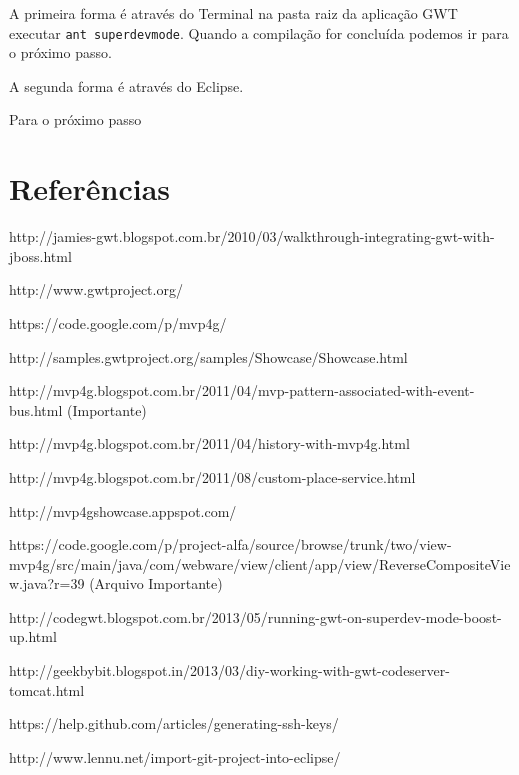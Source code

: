 A primeira forma é através do Terminal na pasta raiz da aplicação GWT executar \texttt{ant superdevmode}. Quando a compilação for
concluída podemos ir para o próximo passo.

A segunda forma é através do Eclipse.

Para o próximo passo




\section{Referências}

http://jamies-gwt.blogspot.com.br/2010/03/walkthrough-integrating-gwt-with-jboss.html

http://www.gwtproject.org/

https://code.google.com/p/mvp4g/

http://samples.gwtproject.org/samples/Showcase/Showcase.html

http://mvp4g.blogspot.com.br/2011/04/mvp-pattern-associated-with-event-bus.html (Importante)

http://mvp4g.blogspot.com.br/2011/04/history-with-mvp4g.html

http://mvp4g.blogspot.com.br/2011/08/custom-place-service.html

http://mvp4gshowcase.appspot.com/

https://code.google.com/p/project-alfa/source/browse/trunk/two/view-mvp4g/src/main/java/com/webware/view/client/app/view/ReverseCompositeView.java?r=39
(Arquivo Importante)

http://codegwt.blogspot.com.br/2013/05/running-gwt-on-superdev-mode-boost-up.html

http://geekbybit.blogspot.in/2013/03/diy-working-with-gwt-codeserver-tomcat.html

https://help.github.com/articles/generating-ssh-keys/

http://www.lennu.net/import-git-project-into-eclipse/

